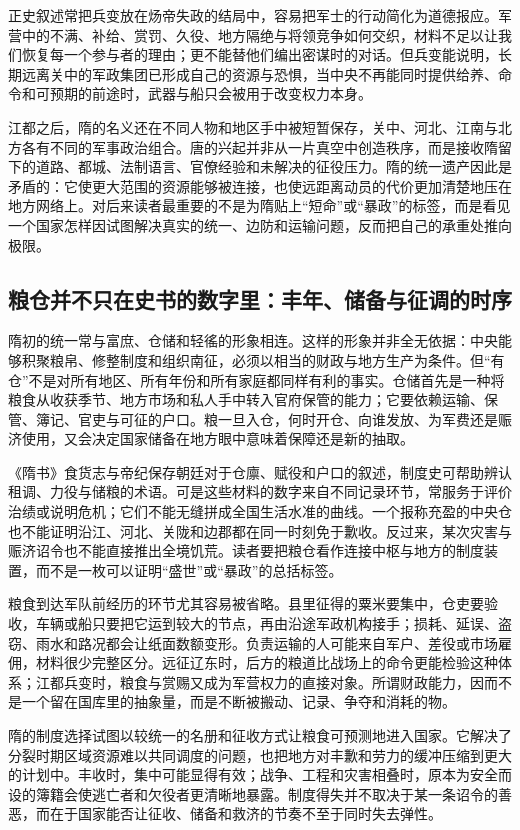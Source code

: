 正史叙述常把兵变放在炀帝失政的结局中，容易把军士的行动简化为道德报应。军营中的不满、补给、赏罚、久役、地方隔绝与将领竞争如何交织，材料不足以让我们恢复每一个参与者的理由；更不能替他们编出密谋时的对话。但兵变能说明，长期远离关中的军政集团已形成自己的资源与恐惧，当中央不再能同时提供给养、命令和可预期的前途时，武器与船只会被用于改变权力本身。

江都之后，隋的名义还在不同人物和地区手中被短暂保存，关中、河北、江南与北方各有不同的军事政治组合。唐的兴起并非从一片真空中创造秩序，而是接收隋留下的道路、都城、法制语言、官僚经验和未解决的征役压力。隋的统一遗产因此是矛盾的：它使更大范围的资源能够被连接，也使远距离动员的代价更加清楚地压在地方网络上。对后来读者最重要的不是为隋贴上“短命”或“暴政”的标签，而是看见一个国家怎样因试图解决真实的统一、边防和运输问题，反而把自己的承重处推向极限。

\subsection{粮仓并不只在史书的数字里：丰年、储备与征调的时序}
隋初的统一常与富庶、仓储和轻徭的形象相连。这样的形象并非全无依据：中央能够积聚粮帛、修整制度和组织南征，必须以相当的财政与地方生产为条件。但“有仓”不是对所有地区、所有年份和所有家庭都同样有利的事实。仓储首先是一种将粮食从收获季节、地方市场和私人手中转入官府保管的能力；它要依赖运输、保管、簿记、官吏与可征的户口。粮一旦入仓，何时开仓、向谁发放、为军费还是赈济使用，又会决定国家储备在地方眼中意味着保障还是新的抽取。

《隋书》食货志与帝纪保存朝廷对于仓廪、赋役和户口的叙述，制度史可帮助辨认租调、力役与储粮的术语。可是这些材料的数字来自不同记录环节，常服务于评价治绩或说明危机；它们不能无缝拼成全国生活水准的曲线。一个报称充盈的中央仓也不能证明沿江、河北、关陇和边郡都在同一时刻免于歉收。反过来，某次灾害与赈济诏令也不能直接推出全境饥荒。读者要把粮仓看作连接中枢与地方的制度装置，而不是一枚可以证明“盛世”或“暴政”的总括标签。

粮食到达军队前经历的环节尤其容易被省略。县里征得的粟米要集中，仓吏要验收，车辆或船只要把它运到较大的节点，再由沿途军政机构接手；损耗、延误、盗窃、雨水和路况都会让纸面数额变形。负责运输的人可能来自军户、差役或市场雇佣，材料很少完整区分。远征辽东时，后方的粮道比战场上的命令更能检验这种体系；江都兵变时，粮食与赏赐又成为军营权力的直接对象。所谓财政能力，因而不是一个留在国库里的抽象量，而是不断被搬动、记录、争夺和消耗的物。

隋的制度选择试图以较统一的名册和征收方式让粮食可预测地进入国家。它解决了分裂时期区域资源难以共同调度的问题，也把地方对丰歉和劳力的缓冲压缩到更大的计划中。丰收时，集中可能显得有效；战争、工程和灾害相叠时，原本为安全而设的簿籍会使逃亡者和欠役者更清晰地暴露。制度得失并不取决于某一条诏令的善恶，而在于国家能否让征收、储备和救济的节奏不至于同时失去弹性。


